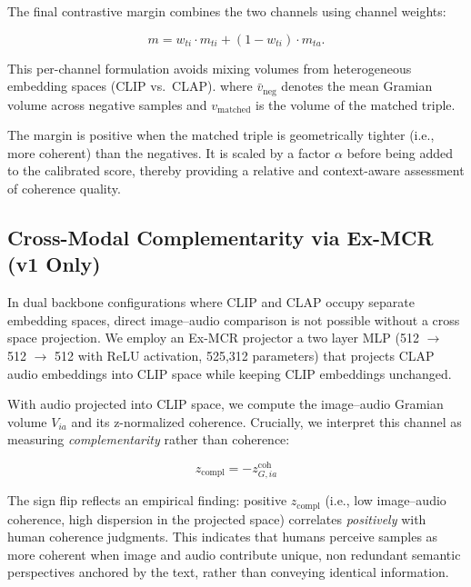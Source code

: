 \documentclass[a4paper,fleqn]{cas-sc}
\begin{document}
\begin{itemize}
The final contrastive margin combines the two channels using channel weights:

\begin{equation}
m =
w_{ti} \cdot m_{ti}
+
(1 - w_{ti}) \cdot m_{ta}.
\end{equation}

This per-channel formulation avoids mixing volumes from heterogeneous embedding spaces (CLIP vs.\ CLAP).
where $\bar{v}_{\text{neg}}$ denotes the mean Gramian volume across negative samples and $v_{\text{matched}}$ is the volume of the matched triple.

The margin is positive when the matched triple is geometrically tighter (i.e., more coherent) than the negatives. It is scaled by a factor $\alpha$ before being added to the calibrated score, thereby providing a relative and context-aware assessment of coherence quality.

\subsection{Cross-Modal Complementarity via Ex-MCR (v1 Only)}\label{sec:exmcr-complementarity}

In dual backbone configurations where CLIP and CLAP occupy separate embedding spaces, direct image--audio comparison is not possible without a cross space projection. We employ an Ex-MCR projector \citep{wang2024exmcr} a two layer MLP (512 $\to$ 512 $\to$ 512 with ReLU activation, 525,312 parameters) that projects CLAP audio embeddings into CLIP space while keeping CLIP embeddings unchanged.

With audio projected into CLIP space, we compute the image--audio Gramian volume $V_{ia}$ and its z-normalized coherence. Crucially, we interpret this channel as measuring \emph{complementarity} rather than coherence:

\begin{equation}\label{eq:complementarity}
z_{\mathrm{compl}} = -z_{G,ia}^{\mathrm{coh}}
\end{equation}

The sign flip reflects an empirical finding: positive $z_{\mathrm{compl}}$ (i.e., low image--audio coherence, high dispersion in the projected space) correlates \emph{positively} with human coherence judgments. This indicates that humans perceive samples as more coherent when image and audio contribute unique, non redundant semantic perspectives anchored by the text, rather than conveying identical information.


\end{itemize}
\end{document}
